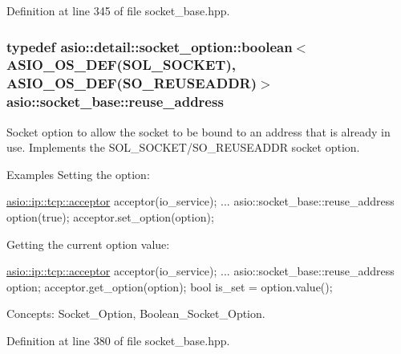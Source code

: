 Definition at line 345 of file socket\+\_\+base.\+hpp.

\hypertarget{classasio_1_1socket__base_a67c5df52b56da13637929727916e4a0a}{}
\subsubsection[{reuse\+\_\+address}]{\setlength{\rightskip}{0pt plus 5cm}typedef {\bf asio\+::detail\+::socket\+\_\+option\+::boolean}$<$ {\bf A\+S\+I\+O\+\_\+\+O\+S\+\_\+\+D\+E\+F}(S\+O\+L\+\_\+\+S\+O\+C\+K\+E\+T), {\bf A\+S\+I\+O\+\_\+\+O\+S\+\_\+\+D\+E\+F}(S\+O\+\_\+\+R\+E\+U\+S\+E\+A\+D\+D\+R)$>$ {\bf asio\+::socket\+\_\+base\+::reuse\+\_\+address}}\label{classasio_1_1socket__base_a67c5df52b56da13637929727916e4a0a}
Socket option to allow the socket to be bound to an address that is already in use. Implements the S\+O\+L\+\_\+\+S\+O\+C\+K\+E\+T/\+S\+O\+\_\+\+R\+E\+U\+S\+E\+A\+D\+D\+R socket option.

\begin{DoxyParagraph}{Examples}
Setting the option\+: 
\begin{DoxyCode}
\hyperlink{classasio_1_1basic__socket__acceptor}{asio::ip::tcp::acceptor} acceptor(io\_service); 
...
asio::socket\_base::reuse\_address option(\textcolor{keyword}{true});
acceptor.set\_option(option);
\end{DoxyCode}

\end{DoxyParagraph}
\begin{DoxyParagraph}{}
Getting the current option value\+: 
\begin{DoxyCode}
\hyperlink{classasio_1_1basic__socket__acceptor}{asio::ip::tcp::acceptor} acceptor(io\_service); 
...
asio::socket\_base::reuse\_address option;
acceptor.get\_option(option);
\textcolor{keywordtype}{bool} is\_set = option.value();
\end{DoxyCode}

\end{DoxyParagraph}
\begin{DoxyParagraph}{Concepts\+:}
Socket\+\_\+\+Option, Boolean\+\_\+\+Socket\+\_\+\+Option. 
\end{DoxyParagraph}


Definition at line 380 of file socket\+\_\+base.\+hpp.

\hypertarget{classasio_1_1socket__base_a0d4a964ee76ec66ae251e903bff872e5}{}
